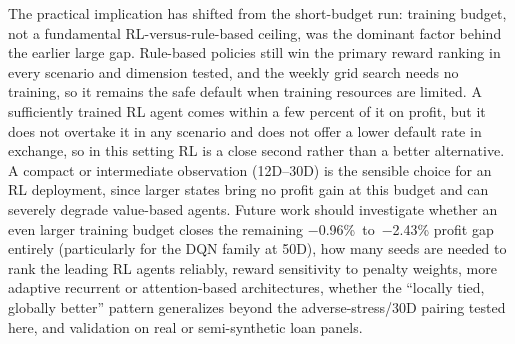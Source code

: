 \documentclass[preprint,review,authoryear,12pt]{elsarticle}
\begin{document}
\noindent
The practical implication has shifted from the short-budget run: training budget, not a
fundamental RL-versus-rule-based ceiling, was the dominant factor behind the earlier
large gap. Rule-based policies still win the primary reward ranking in every scenario
and dimension tested, and the weekly grid search needs no training, so it remains the
safe default when training resources are limited. A sufficiently trained RL agent comes
within a few percent of it on profit, but it does not overtake it in any scenario and does not
offer a lower default rate in exchange, so in this setting RL is a close second rather
than a better alternative. A compact or intermediate observation (12D--30D) is the
sensible choice for an RL deployment, since larger states bring no profit gain at this
budget and can severely degrade value-based agents. Future work should investigate
whether an even larger training budget closes the remaining $-$0.96\%~to~$-$2.43\% profit
gap entirely (particularly for the DQN family at 50D), how many seeds are needed to rank
the leading RL agents reliably, reward sensitivity to penalty weights, more adaptive
recurrent or attention-based architectures, whether the ``locally tied, globally
better'' pattern generalizes beyond the adverse-stress/30D pairing tested here, and
validation on real or semi-synthetic loan panels.
\end{document}
